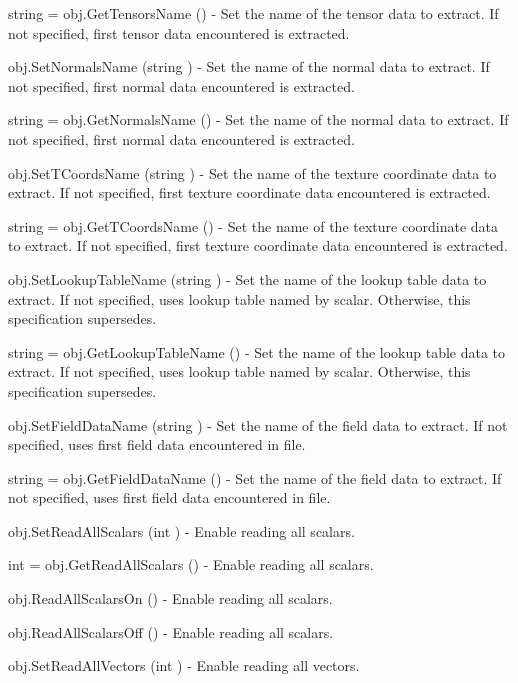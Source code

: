 \begin{DoxyItemize}
\item {\ttfamily string = obj.\-Get\-Tensors\-Name ()} -\/ Set the name of the tensor data to extract. If not specified, first tensor data encountered is extracted.  
\item {\ttfamily obj.\-Set\-Normals\-Name (string )} -\/ Set the name of the normal data to extract. If not specified, first normal data encountered is extracted.  
\item {\ttfamily string = obj.\-Get\-Normals\-Name ()} -\/ Set the name of the normal data to extract. If not specified, first normal data encountered is extracted.  
\item {\ttfamily obj.\-Set\-T\-Coords\-Name (string )} -\/ Set the name of the texture coordinate data to extract. If not specified, first texture coordinate data encountered is extracted.  
\item {\ttfamily string = obj.\-Get\-T\-Coords\-Name ()} -\/ Set the name of the texture coordinate data to extract. If not specified, first texture coordinate data encountered is extracted.  
\item {\ttfamily obj.\-Set\-Lookup\-Table\-Name (string )} -\/ Set the name of the lookup table data to extract. If not specified, uses lookup table named by scalar. Otherwise, this specification supersedes.  
\item {\ttfamily string = obj.\-Get\-Lookup\-Table\-Name ()} -\/ Set the name of the lookup table data to extract. If not specified, uses lookup table named by scalar. Otherwise, this specification supersedes.  
\item {\ttfamily obj.\-Set\-Field\-Data\-Name (string )} -\/ Set the name of the field data to extract. If not specified, uses first field data encountered in file.  
\item {\ttfamily string = obj.\-Get\-Field\-Data\-Name ()} -\/ Set the name of the field data to extract. If not specified, uses first field data encountered in file.  
\item {\ttfamily obj.\-Set\-Read\-All\-Scalars (int )} -\/ Enable reading all scalars.  
\item {\ttfamily int = obj.\-Get\-Read\-All\-Scalars ()} -\/ Enable reading all scalars.  
\item {\ttfamily obj.\-Read\-All\-Scalars\-On ()} -\/ Enable reading all scalars.  
\item {\ttfamily obj.\-Read\-All\-Scalars\-Off ()} -\/ Enable reading all scalars.  
\item {\ttfamily obj.\-Set\-Read\-All\-Vectors (int )} -\/ Enable reading all vectors.  

\end{DoxyItemize}
